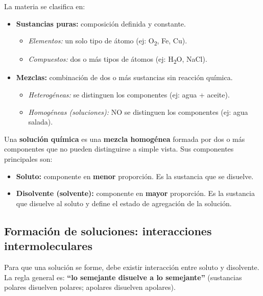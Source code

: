 \documentclass[11pt,a4paper]{article}
\begin{document}
\begin{tcolorbox}[recuerda]
La materia se clasifica en:
\begin{itemize}[nosep]
  \item \textbf{Sustancias puras:} composición definida y constante.
    \begin{itemize}[nosep]
      \item \textit{Elementos:} un solo tipo de átomo (ej: O\textsubscript{2}, Fe, Cu).
      \item \textit{Compuestos:} dos o más tipos de átomos (ej: H\textsubscript{2}O, NaCl).
    \end{itemize}
  \item \textbf{Mezclas:} combinación de dos o más sustancias sin reacción química.
    \begin{itemize}[nosep]
      \item \textit{Heterogéneas:} se distinguen los componentes (ej: agua + aceite).
      \item \textit{Homogéneas (soluciones):} NO se distinguen los componentes (ej: agua salada).
    \end{itemize}
\end{itemize}
\end{tcolorbox}

\begin{tcolorbox}[definicion, title=Solución química]
Una \textbf{solución química} es una \textbf{mezcla homogénea} formada por dos o más componentes que no pueden distinguirse a simple vista. Sus componentes principales son:
\begin{itemize}[nosep]
  \item \textbf{Soluto:} componente en \textbf{menor} proporción. Es la sustancia que se disuelve.
  \item \textbf{Disolvente (solvente):} componente en \textbf{mayor} proporción. Es la sustancia que disuelve al soluto y define el estado de agregación de la solución.
\end{itemize}
\end{tcolorbox}

\subsection{Formación de soluciones: interacciones intermoleculares}

Para que una solución se forme, debe existir interacción entre soluto y disolvente. La regla general es: \textbf{``lo semejante disuelve a lo semejante''} (sustancias polares disuelven polares; apolares disuelven apolares).
\end{document}
